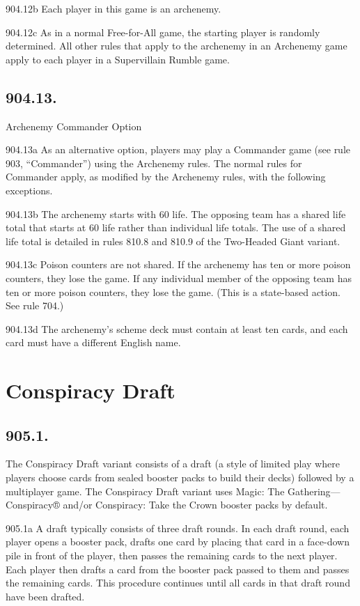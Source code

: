 904.12b Each player in this game is an archenemy.

904.12c As in a normal Free-for-All game, the starting player is randomly determined. All other rules that apply to the archenemy in an Archenemy game apply to each player in a Supervillain Rumble game.

\subsection*{904.13.}
Archenemy Commander Option

904.13a As an alternative option, players may play a Commander game (see rule 903, “Commander”) using the Archenemy rules. The normal rules for Commander apply, as modified by the Archenemy rules, with the following exceptions.

904.13b The archenemy starts with 60 life. The opposing team has a shared life total that starts at 60 life rather than individual life totals. The use of a shared life total is detailed in rules 810.8 and 810.9 of the Two-Headed Giant variant.

904.13c Poison counters are not shared. If the archenemy has ten or more poison counters, they lose the game. If any individual member of the opposing team has ten or more poison counters, they lose the game. (This is a state-based action. See rule 704.)

904.13d The archenemy’s scheme deck must contain at least ten cards, and each card must have a different English name.

\section{Conspiracy Draft}
\subsection*{905.1.}
The Conspiracy Draft variant consists of a draft (a style of limited play where players choose cards from sealed booster packs to build their decks) followed by a multiplayer game. The Conspiracy Draft variant uses Magic: The Gathering—Conspiracy® and/or Conspiracy: Take the Crown booster packs by default.

905.1a A draft typically consists of three draft rounds. In each draft round, each player opens a booster pack, drafts one card by placing that card in a face-down pile in front of the player, then passes the remaining cards to the next player. Each player then drafts a card from the booster pack passed to them and passes the remaining cards. This procedure continues until all cards in that draft round have been drafted.

